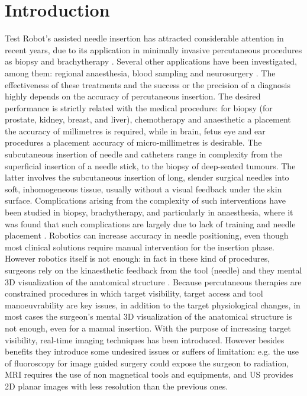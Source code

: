 \chapter{Introduction} %

Test Robot's assisted needle insertion has attracted considerable attention in recent years, due to its application in minimally invasive percutaneous procedures as biopsy and brachytherapy \cite{Abolhassani2007}. Several other applications have been investigated, among them: regional anaesthesia, blood sampling \cite{Zivanovic2000} and neurosurgery \cite{Rizun2004}.
The effectiveness of these treatments and the success or the precision of a diagnosis highly depends on the accuracy of percutaneous insertion.
The desired performance is strictly related with the medical procedure: for biopsy (for prostate, kidney, breast, and liver), chemotherapy and anaesthetic a placement the accuracy of millimetres is required, while in brain, fetus eye and ear procedures a placement accuracy of micro-millimetres is desirable.
The subcutaneous insertion of needle and catheters range in complexity from the superficial insertion of a needle stick, to the biopsy of deep-seated tumours.
The latter involves the subcutaneous insertion of long, slender surgical needles into soft, inhomogeneous tissue, usually without a visual feedback under the skin surface.
Complications arising from the complexity of such interventions have been studied in biopsy, brachytherapy, and particularly in anaesthesia, where it was found that such complications are largely due to lack of training and needle placement \cite{DiMaio2003}.
Robotics can increase accuracy in needle positioning, even though most clinical solutions require manual intervention for the insertion phase.
However robotics itself is not enough: in fact in these kind of procedures, surgeons rely on the kinaesthetic feedback from the tool (needle) and they mental 3D visualization of the anatomical structure \cite{DiMaio2003}.
Because percutaneous therapies are constrained procedures in which target visibility, target access and tool manoeuvrability are key issues, in addition to the target physiological changes, in most cases the surgeon's mental 3D visualization of the anatomical structure is not enough, even for a manual insertion.
With the purpose of increasing target visibility, real-time imaging techniques has been introduced. However besides benefits they introduce some undesired issues or suffers of limitation: e.g. the use of fluoroscopy for image guided surgery could expose the surgeon to radiation, MRI requires the use of non magnetical tools and equipments, and US provides 2D planar images with less resolution than the previous ones.
